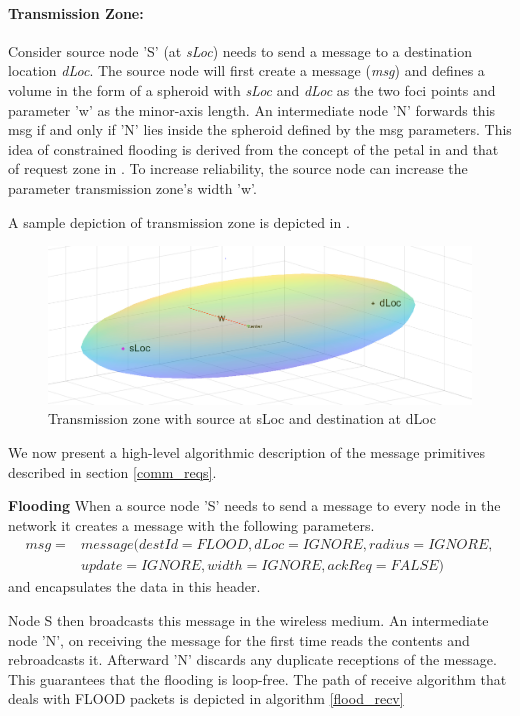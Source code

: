 \paragraph{Transmission Zone:} Consider source node 'S' (at \emph{sLoc}) needs to send a message to a destination location \emph{dLoc}. The source node will first create a message (\emph{msg}) and defines a volume in the form of a spheroid with \emph{sLoc} and \emph{dLoc} as the two foci points and parameter 'w' as the minor-axis length. An intermediate node 'N' forwards this msg if and only if 'N' lies inside the spheroid defined by the msg parameters. This idea of constrained flooding is derived from the concept of the petal in \cite{6133499} and that of request zone in \cite{Ko:1998:LRM:288235.288252}. To increase reliability, the source node can increase the parameter transmission zone's width 'w'.

A sample depiction of transmission zone is depicted in .

\begin{figure}[hbtp]
\centering
\includegraphics[width=1\textwidth]{Chapter-3/figs/Spheroid}
\caption{Transmission zone with source at sLoc and destination at dLoc}
\label{fig:spheroid}
\end{figure}

We now present a high-level algorithmic description of the message primitives described in section \ref{comm_reqs}.

\textbf{Flooding}
When a source node 'S' needs to send a message to every node in the network it creates a message with the following parameters.
\begin{eqnarray*}
msg = & message(destId = FLOOD, dLoc = IGNORE, radius = IGNORE,\\
    & update = IGNORE, width = IGNORE, ackReq = FALSE)
\end{eqnarray*} and encapsulates the data in this header.

Node S then broadcasts this message in the wireless medium. An intermediate node 'N', on receiving the message for the first time reads the contents and rebroadcasts it. Afterward 'N' discards any duplicate receptions of the message. This guarantees that the flooding is loop-free.
The path of receive algorithm that deals with FLOOD packets is depicted in algorithm \ref{flood_recv}

